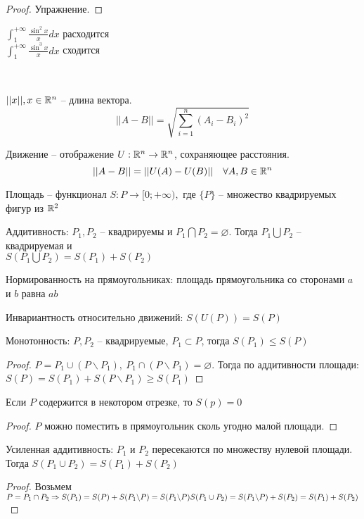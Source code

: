 \begin{proof}
	Упражнение.
\end{proof}

\begin{Cons}
	$\displaystyle \int_{1}^{+\infty} \frac{\sin^2 x}{x} dx$ расходится\\
	$\displaystyle \int_{1}^{+\infty} \frac{\sin^3 x}{x} dx$ сходится
\end{Cons}

\\
\begin{Def} 
	$||x||, x \in \mathbb{R}^n$ -- длина вектора. \\
	$$\displaystyle ||A-B|| = \sqrt{\sum_{i=1}^{n} (A_i - B_i)^2}$$
\end{Def} 

\begin{Def} 
	Движение -- отображение $U: \mathbb{R}^n \to \mathbb{R}^n$, сохраняющее расстояния.\\
	$$||A-B|| = ||U(A) - U(B)|| \ \ \ \forall A, B \in \mathbb{R}^n$$
\end{Def} 

\begin{Def} 
	Площадь -- функционал $S: {P} \to [0; +\infty),$ где $\{P\}$ -- множество квадрируемых фигур из $\mathbb{R}^2$
\end{Def} 

\begin{Thm}
	\begin{MyList}
		\item Аддитивность: $P_1, P_2$ -- квадрируемы и $P_1 \bigcap P_2 = \varnothing$. Тогда
		$P_1 \bigcup P_2$ -- квадрируемая и \\$S(P_1 \bigcup P_2) = S(P_1) + S(P_2)$
		\item Нормированность на прямоугольниках: площадь прямоугольника со сторонами $a$ и $b$ равна $ab$
		\item Инвариантность относительно движений: $S(U(P)) = S(P)$
		\item Монотонность: $P, P_2$ -- квадрируемые, $P_1 \subset P$, тогда $S(P_1) \leqslant S(P)$
		\begin{proof}
			$P = P_1 \cup (P \backslash P_1), \ P_1 \cap (P \backslash P_1) = \varnothing$. Тогда по аддитивности
			площади: $S(P) = S(P_1) + S(P \backslash P_1) \geqslant S(P_1)$
		\end{proof}
		\item Если $P$ содержится в некотором отрезке, то $S(p) = 0$
		\begin{proof}
			$P$ можно поместить в прямоугольник сколь угодно малой площади. 
		\end{proof}
		\item Усиленная аддитивность: $P_1$ и $P_2$ пересекаются по множеству нулевой площади. Тогда
		$S(P_1 \cup P_2) = S(P_1) + S(P_2)$
		\begin{proof}
			Возьмем $P = P_1 \cap P_2 \Rightarrow S(P_1) = S(P) + S(P_1 \backslash P) = S(P_1 \backslash P)\\
			S(P_1 \cup P_2) = S(P_1 \backslash P)  +S(P_2) = S(P_1) + S(P_2)$
		\end{proof}
 	\end{MyList}
\end{Thm}

